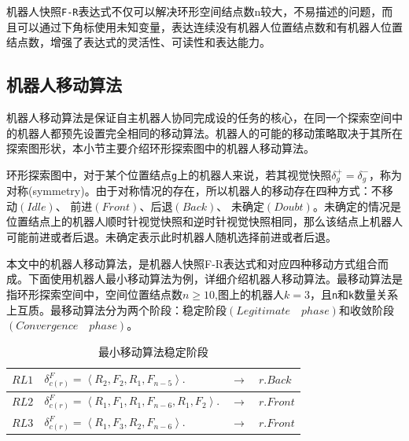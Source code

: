 机器人快照\verb|F-R|表达式不仅可以解决环形空间结点数n较大，不易描述的问题，而且可以通过下角标使用未知变量，表达连续没有机器人位置结点数和有机器人位置结点数，增强了表达式的灵活性、可读性和表达能力。

\subsection{机器人移动算法}
机器人移动算法是保证自主机器人协同完成设的任务的核心，在同一个探索空间中的机器人都预先设置完全相同的移动算法。机器人的可能的移动策略取决于其所在探索图形状，本小节主要介绍环形探索图中的机器人移动算法。

环形探索图中，对于某个位置结点\verb|g|上的机器人来说，若其视觉快照$\delta_g^+ = \delta_g^-$，称为对称(symmetry)。由于对称情况的存在，所以机器人的移动存在四种方式：不移动$\left(Idle\right)$、 前进$\left(Front\right)$、后退$\left(Back\right)$、 未确定$\left(Doubt\right)$。未确定的情况是位置结点上的机器人顺时针视觉快照和逆时针视觉快照相同，那么该结点上机器人可能前进或者后退。未确定表示此时机器人随机选择前进或者后退。

本文中的机器人移动算法，是机器人快照F-R表达式和对应四种移动方式组合而成。下面使用机器人最小移动算法为例，详细介绍机器人移动算法。最移动算法是指环形探索空间中，空间位置结点数$n \geq 10$,图上的机器人$k = 3$，且\verb|n|和\verb|k|数量关系上互质。最移动算法分为两个阶段：稳定阶段$\left(Legitimate\quad phase\right)$和收敛阶段$\left(Convergence\quad phase\right)$。

\vspace{0.5cm}

\begin{table}[hbt]
    \centering
    \caption{最小移动算法稳定阶段}
    \begin{tabular}{|p{2cm}|p{8cm}|p{2cm}|p{2cm}|}
        \hline
        $RL1$&$\delta_{c\left(r\right)}^F = \left\langle R_2,F_2,R_1,F_{n-5} \right\rangle.$&$\rightarrow$&$r.Back$\\
        \hline
        $RL2$&$\delta_{c\left(r\right)}^F = \left\langle R_1,F_1,R_1,F_{n-6},R_1,F_2 \right\rangle.$&$\rightarrow$&$r.Front$\\
        \hline
        $RL3$&$\delta_{c\left(r\right)}^F = \left\langle R_1,F_3,R_2,F_{n-6}\right\rangle.$&$\rightarrow$&$r.Front$\\
        \hline
    \end{tabular}
    \label{table:minalgotithm}
\end{table}

\vspace{0.5cm}


